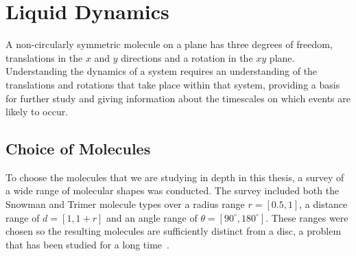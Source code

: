 \chapter{Liquid Dynamics}

A non-circularly symmetric molecule on a plane has three degrees of freedom, translations in the $x$ and $y$ directions and a rotation in the $xy$ plane. Understanding the dynamics of a system requires an understanding of the translations and rotations that take place within that system, providing a basis for further study and giving information about the timescales on which events are likely to occur.

\section{Choice of Molecules}

To choose the molecules that we are studying in depth in this thesis, a survey of a wide range of molecular shapes was conducted. The survey included both the Snowman and Trimer molecule types over a radius range $r = [0.5,1]$, a distance range of $d = [1,1+r]$ and an angle range of $\theta = [90^\circ,180^\circ]$. These ranges were chosen so the resulting molecules are sufficiently distinct from a disc, a problem that has been studied for a long time~\cite{verlet:67}.

